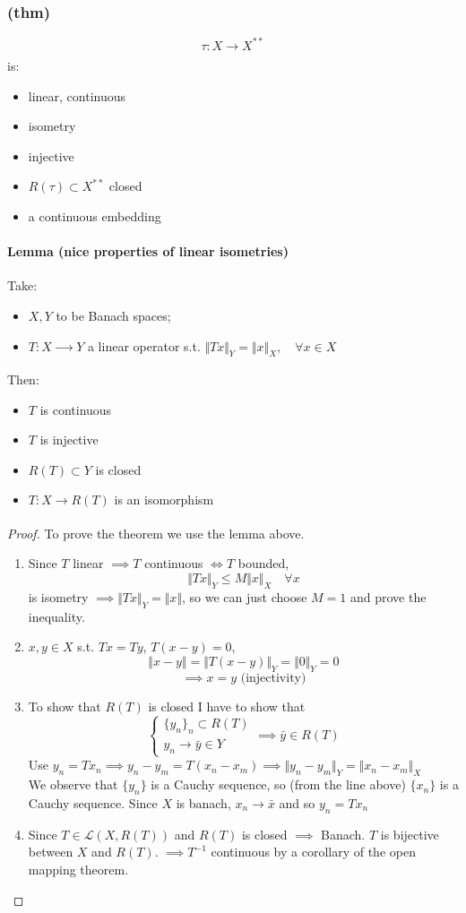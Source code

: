 \subsubsection{(thm)}
$$\tau:X\xrightarrow[\ \ \ \  \ ]{}X^{**}$$
is:
\begin{itemize}
    \item linear, continuous
    \item isometry
    \item injective
    \item $R(\tau)\subset X^{**}$ closed
    \item a continuous embedding
\end{itemize}
\paragraph{Lemma (nice properties of linear isometries)}
Take:
\begin{itemize}
    \item $X,Y$ to be Banach spaces;
    \item $T:X\xrightarrow[\quad\quad]{}Y$ a linear operator s.t. $\Vert Tx\Vert_Y=\Vert x\Vert_X,\quad \forall x\in X$
\end{itemize}
Then:
\begin{itemize}
    \item $T$ is continuous
    \item $T$ is injective
    \item $R(T)\subset Y$ is closed
    \item $T:X\xrightarrow[\quad]{}R(T)$ is an isomorphism
\end{itemize}
\begin{proof}
    To prove the theorem we use the lemma above.
    \begin{enumerate}
        \item     Since $T$ linear $\implies T$ continuous $\iff T$ bounded,\\
    $$\Vert Tx\Vert_Y\leq M\Vert x\Vert_X\quad \forall x$$
    is isometry $\implies \Vert Tx\Vert_Y=\Vert x\Vert$, so we can just choose $M=1$ and prove the inequality.
    \item $x,y\in X$ s.t. $Tx=Ty$, $T(x-y)=0$, $$\Vert x-y\Vert =\Vert T(x-y)\Vert _Y=\Vert 0\Vert_Y=0$$
    $$\implies x=y \text{ (injectivity)}$$
    \item To show that $R(T)$ is closed I have to show that 
    $$\begin{cases}\{y_n\}_n\subset R(T)\\ y_n\to \bar y\in Y\end{cases}\implies \bar y\in R(T)$$
    Use $y_n=Tx_n\implies y_n-y_m=T(x_n-x_m)\implies\Vert y_n-y_m\Vert_Y=\Vert x_n-x_m\Vert_X$\\
    We observe that $\{y_n\}$ is a Cauchy sequence, so (from the line above) $\{x_n\}$ is a Cauchy sequence. Since $X$ is banach, $x_n\to \bar x$ and so $y_n=Tx_n$
    \item Since $T\in \mathcal L(X,R(T))$ and $R(T)$ is closed $\implies $ Banach.
    $T$ is bijective between $X$ and $R(T)$. $\implies T^{-1}$ continuous by a corollary of the open mapping theorem.
    \end{enumerate}

    
\end{proof}

